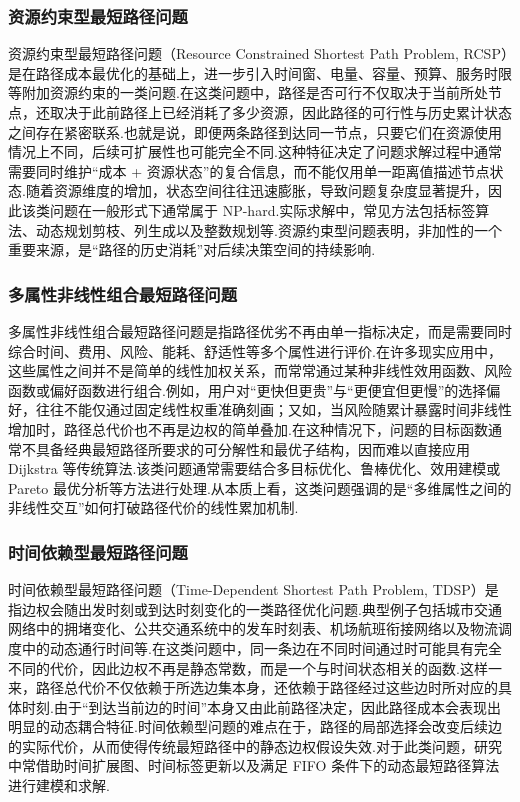 \subsubsection{资源约束型最短路径问题}

资源约束型最短路径问题（Resource Constrained Shortest Path Problem, RCSP）是在路径成本最优化的基础上，进一步引入时间窗、电量、容量、预算、服务时限等附加资源约束的一类问题.在这类问题中，路径是否可行不仅取决于当前所处节点，还取决于此前路径上已经消耗了多少资源，因此路径的可行性与历史累计状态之间存在紧密联系.也就是说，即便两条路径到达同一节点，只要它们在资源使用情况上不同，后续可扩展性也可能完全不同.这种特征决定了问题求解过程中通常需要同时维护“成本 + 资源状态”的复合信息，而不能仅用单一距离值描述节点状态.随着资源维度的增加，状态空间往往迅速膨胀，导致问题复杂度显著提升，因此该类问题在一般形式下通常属于 NP-hard.实际求解中，常见方法包括标签算法、动态规划剪枝、列生成以及整数规划等.资源约束型问题表明，非加性的一个重要来源，是“路径的历史消耗”对后续决策空间的持续影响\cite{pugliese2013survey,irnich2005spprc,barnhart1998branch,bode2012cutfirst}.

\subsubsection{多属性非线性组合最短路径问题}

多属性非线性组合最短路径问题是指路径优劣不再由单一指标决定，而是需要同时综合时间、费用、风险、能耗、舒适性等多个属性进行评价.在许多现实应用中，这些属性之间并不是简单的线性加权关系，而常常通过某种非线性效用函数、风险函数或偏好函数进行组合.例如，用户对“更快但更贵”与“更便宜但更慢”的选择偏好，往往不能仅通过固定线性权重准确刻画；又如，当风险随累计暴露时间非线性增加时，路径总代价也不再是边权的简单叠加.在这种情况下，问题的目标函数通常不具备经典最短路径所要求的可分解性和最优子结构，因而难以直接应用 Dijkstra 等传统算法.该类问题通常需要结合多目标优化、鲁棒优化、效用建模或 Pareto 最优分析等方法进行处理.从本质上看，这类问题强调的是“多维属性之间的非线性交互”如何打破路径代价的线性累加机制\cite{ehrgott2005multicriteria,deb2002nsga2,kim2006adaptive,bertsimas2004price}.

\subsubsection{时间依赖型最短路径问题}

时间依赖型最短路径问题（Time-Dependent Shortest Path Problem, TDSP）是指边权会随出发时刻或到达时刻变化的一类路径优化问题.典型例子包括城市交通网络中的拥堵变化、公共交通系统中的发车时刻表、机场航班衔接网络以及物流调度中的动态通行时间等.在这类问题中，同一条边在不同时间通过时可能具有完全不同的代价，因此边权不再是静态常数，而是一个与时间状态相关的函数.这样一来，路径总代价不仅依赖于所选边集本身，还依赖于路径经过这些边时所对应的具体时刻.由于“到达当前边的时间”本身又由此前路径决定，因此路径成本会表现出明显的动态耦合特征.时间依赖型问题的难点在于，路径的局部选择会改变后续边的实际代价，从而使得传统最短路径中的静态边权假设失效.对于此类问题，研究中常借助时间扩展图、时间标签更新以及满足 FIFO 条件下的动态最短路径算法进行建模和求解\cite{cooke1966shortest,orda1990shortest,dean2005fifo,chabini1998discrete}.

